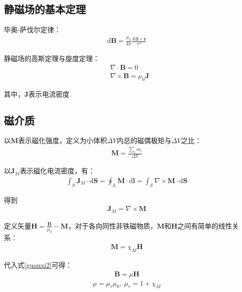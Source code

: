 \documentclass[main.tex]{subfiles}
\begin{document}
\subsection{静磁场的基本定理}
毕奥-萨伐尔定律：
\begin{align}
    \mathrm{d}\boldsymbol{B} = \frac{\mu _0}{4\pi } \frac{I\mathrm{d}\boldsymbol{l}\times \boldsymbol{r}}{r^3}
\end{align}

静磁场的高斯定理与旋度定理：
\begin{align}
    &\nabla \cdot \boldsymbol{B} = 0\\
    &\nabla \times \boldsymbol{B} = \mu _0\boldsymbol{J}
\end{align}

其中，$\boldsymbol{J}$表示电流密度.

\subsection{磁介质}
以$\boldsymbol{M}$表示磁化强度，定义为小体积$\Delta V$内总的磁偶极矩与$\Delta V$之比：
\begin{align}
    \boldsymbol{M} = \frac{\displaystyle \sum_{i}^{}m_i}{\Delta V}
\end{align}

以$\boldsymbol{J}_M$表示磁化电流密度，有：
\begin{align}
    \int_{S}^{} \boldsymbol{J}_M \cdot \mathrm{d}\boldsymbol{S} = \oint_{L}^{} \boldsymbol{M} \cdot \mathrm{d}\boldsymbol{l} = \int_{S}^{} \nabla \times \boldsymbol{M} \cdot \mathrm{d}\boldsymbol{S} 
\end{align}

得到
\begin{align}
    \label{guanxi2}\boldsymbol{J}_M = \nabla \times \boldsymbol{M}
\end{align}

定义矢量$\boldsymbol{H} = \frac{\boldsymbol{B}}{\mu _0}- \boldsymbol{M}$，对于各向同性非铁磁物质，$\boldsymbol{M}$和$\boldsymbol{H}$之间有简单的线性关系：
\begin{align}
    \boldsymbol{M} = \chi _M \boldsymbol{H}
\end{align}

代入式\ref{guanxi2}可得：
\begin{align}
    \boldsymbol{B} = \mu \boldsymbol{H}
\end{align}
\begin{align}
    \mu = \mu _r \mu _0,\ \mu _r = 1+\chi _M
\end{align}
\end{document}
